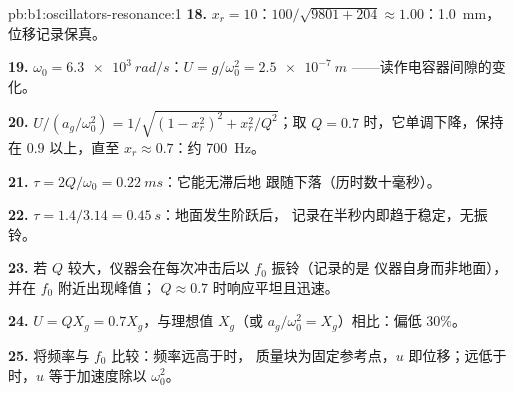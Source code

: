 \begin{solution}{pb:b1:oscillators-resonance:1}
\textbf{18.} $x_r = 10$：$100/\sqrt{9801 + 204} \approx 1.00$：\qty{1.0}{mm}，
位移记录保真。

\textbf{19.} $\omega_0 = \qty{6.3e3}{rad/s}$：$U = g/\omega_0^2 = \qty{2.5e-7}{m}$
——读作电容器间隙的变化。

\textbf{20.} $U/(a_g/\omega_0^2) = 1/\sqrt{(1 - x_r^2)^2 + x_r^2/Q^2}$；取
$Q = 0.7$ 时，它单调下降，保持在 $0.9$ 以上，直至
$x_r \approx 0.7$：约 \qty{700}{Hz}。

\textbf{21.} $\tau = 2Q/\omega_0 = \qty{0.22}{ms}$：它能无滞后地
跟随下落（历时数十毫秒）。

\textbf{22.} $\tau = 1.4/3.14 = \qty{0.45}{s}$：地面发生阶跃后，
记录在半秒内即趋于稳定，无振铃。

\textbf{23.} 若 $Q$ 较大，仪器会在每次冲击后以 $f_0$ 振铃（记录的是
仪器自身而非地面），并在 $f_0$ 附近出现峰值；
$Q \approx 0.7$ 时响应平坦且迅速。

\textbf{24.} $U = QX_g = 0.7X_g$，与理想值 $X_g$（或 $a_g/\omega_0^2
= X_g$）相比：偏低 $30\%$。

\textbf{25.} 将频率与 $f_0$ 比较：频率远高于时，
质量块为固定参考点，$u$ 即位移；远低于时，$u$
等于加速度除以 $\omega_0^2$。
\end{solution}
